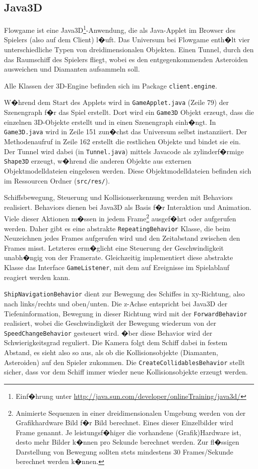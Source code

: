 \documentclass[a4paper,12pt]{scrartcl}
\begin{document}
\subsection{Java3D}
Flowgame ist eine Java3D\footnote{Einf�hrung unter
\url{http://java.sun.com/developer/onlineTraining/java3d/}}-Anwendung, die als
Java-Applet im Browser des Spielers (also auf dem Client) l�uft. Das Universum bei Flowgame enth�lt vier unterschiedliche Typen von dreidimensionalen Objekten. Einen Tunnel, durch den das Raumschiff des Spielers fliegt,
wobei es den entgegenkommenden Asteroiden ausweichen und Diamanten aufsammeln
soll.

Alle Klassen der 3D-Engine befinden sich im Package \texttt{client.engine}.

W�hrend dem Start des Applets wird in \texttt{GameApplet.java} (Zeile 79) der
Szenengraph f�r das Spiel erstellt. Dort wird ein \texttt{Game3D} Objekt
erzeugt, dass die einzelnen 3D-Objekte erstellt und in einen Szenengraph
einh�ngt. In \texttt{Game3D.java} wird in Zeile 151 zun�chst das Universum
selbst instanziiert. Der Methodenaufruf in Zeile 162 erstellt die restlichen Objekte und bindet sie ein. Der Tunnel wird dabei (in \texttt{Tunnel.java}) mittels
Javacode als zylinderf�rmige \texttt{Shape3D} erzeugt, w�hrend die anderen
Objekte aus externen Objektmodelldateien eingelesen werden. Diese Objektmodelldateien befinden sich im
Ressourcen Ordner (\texttt{src/res/}).

Schiffsbewegung, Steuerung und Kollisionserkennung werden mit Behaviors realisiert.
Behaviors dienen bei Java3D als Basis f�r Interaktion und Animation. Viele dieser Aktionen
m�ssen in jedem Frame\footnote{Animierte Sequenzen in einer dreidimensionalen Umgebung werden von der Grafikhardware Bild f�r Bild berechnet. Eines dieser Einzelbilder wird Frame genannt. Je leistungsf�higer die vorhandene (Grafik)Hardware ist, desto mehr Bilder k�nnen pro Sekunde berechnet werden. Zur fl�ssigen Darstellung von Bewegung sollten stets mindestens 30 Frames/Sekunde berechnet werden k�nnen.} ausgef�hrt oder aufgerufen werden. Daher gibt es eine abstrakte \texttt{RepeatingBehavior} Klasse, die beim Neuzeichnen jedes Frames aufgerufen wird und den Zeitabstand zwischen den Frames misst. Letzteres erm�glicht eine Steuerung der Geschwindigkeit unabh�ngig von der Framerate. Gleichzeitig implementiert diese abstrakte Klasse das Interface \texttt{GameListener}, mit dem auf Ereignisse im
Spielablauf reagiert werden kann.

\texttt{ShipNavigationBehavior} dient zur Bewegung des Schiffes in xy-Richtung,
also nach links/rechts und oben/unten. Die z-Achse entspricht bei Java3D der Tiefeninformation, Bewegung
in dieser Richtung wird mit der \texttt{ForwardBehavior} realisiert, wobei die
Geschwindigkeit der Bewegung wiederum von der \texttt{SpeedChangeBehavior}
gesteuert wird. �ber diese Behavior wird der Schwierigkeitsgrad reguliert. Die
Kamera folgt dem Schiff dabei in festem Abstand, es sieht also so aus, als ob die Kollisionsobjekte (Diamanten, Asteroiden) auf den Spieler zukommen. Die
\texttt{CreateCollidablesBehavior} stellt sicher, dass vor dem Schiff immer wieder neue Kollisionsobjekte erzeugt werden.
\end{document}
